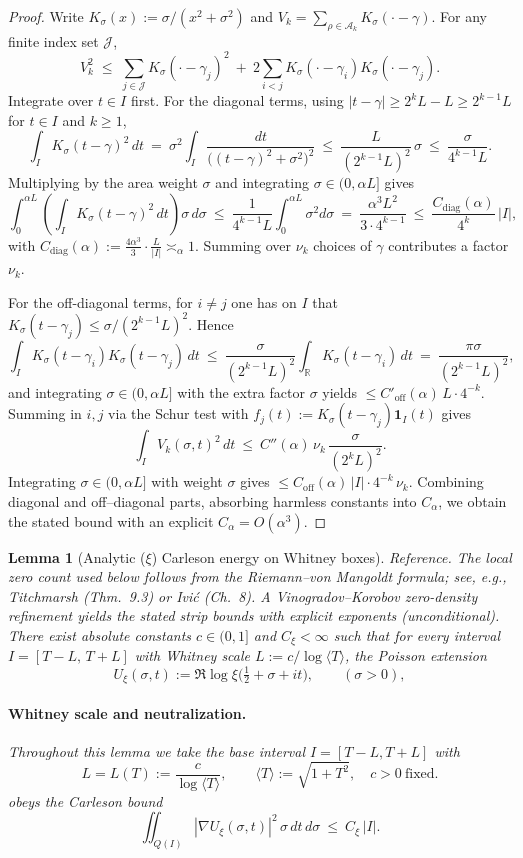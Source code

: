 \documentclass[11pt]{article}
\newtheorem{lemma}[theorem]{Lemma}
\theoremstyle{definition}
\theoremstyle{remark}
\newcommand{\R}{\mathbb{R}}
\begin{document}
\begin{proof}
Write $K_\sigma(x):=\sigma/(x^2+\sigma^2)$ and $V_k=\sum_{\rho\in\mathcal A_k}K_\sigma(\cdot-\gamma)$. For any finite index set $\mathcal J$,
\[
  V_k^2\;\le\; \sum_{j\in\mathcal J} K_\sigma(\cdot-\gamma_j)^2\ +\ 2\!\!\sum_{i<j} K_\sigma(\cdot-\gamma_i)K_\sigma(\cdot-\gamma_j).
\]
Integrate over $t\in I$ first. For the diagonal terms, using $|t-\gamma|\ge 2^kL-L\ge 2^{k-1}L$ for $t\in I$ and $k\ge 1$,
\[
 \int_I K_\sigma(t-\gamma)^2\,dt\ =\ \sigma^2\!\int_I \frac{dt}{\big((t-\gamma)^2+\sigma^2\big)^2}\ \le\ \frac{L}{(2^{k-1}L)^2}\,\sigma\ \le\ \frac{\sigma}{4^{k-1}L}.
\]
Multiplying by the area weight $\sigma$ and integrating $\sigma\in(0,\alpha L]$ gives
\[
 \int_0^{\alpha L}\!\!\left(\int_I K_\sigma(t-\gamma)^2\,dt\right)\sigma\,d\sigma\ \le\ \frac{1}{4^{k-1}L}\int_0^{\alpha L}\!\sigma^2 d\sigma\ =\ \frac{\alpha^3 L^2}{3\cdot 4^{k-1}}\ \le\ \frac{C_{\mathrm{diag}}(\alpha)}{4^{k}}\,|I|,
\]
with $C_{\mathrm{diag}}(\alpha):=\tfrac{4\alpha^3}{3}\cdot\tfrac{L}{|I|}\asymp_\alpha 1$. Summing over $\nu_k$ choices of $\gamma$ contributes a factor $\nu_k$.

For the off-diagonal terms, for $i\ne j$ one has on $I$ that $K_\sigma(t-\gamma_j)\le \sigma/(2^{k-1}L)^2$. Hence
\[
 \int_I K_\sigma(t-\gamma_i)K_\sigma(t-\gamma_j)\,dt\ \le\ \frac{\sigma}{(2^{k-1}L)^2}\int_\R K_\sigma(t-\gamma_i)\,dt\ =\ \frac{\pi\sigma}{(2^{k-1}L)^2},
\]
and integrating $\sigma\in(0,\alpha L]$ with the extra factor $\sigma$ yields $\le C'_{\mathrm{off}}(\alpha)\,L\cdot 4^{-k}$. Summing in $i,j$ via the Schur test with $f_j(t):=K_\sigma(t-\gamma_j)\mathbf 1_I(t)$ gives
\[
 \int_I V_k(\sigma,t)^2\,dt\ \le\ C''(\alpha)\,\nu_k\,\frac{\sigma}{(2^kL)^2}.
\]
Integrating $\sigma\in(0,\alpha L]$ with weight $\sigma$ gives $\le C_{\mathrm{off}}(\alpha)\,|I|\cdot 4^{-k}\,\nu_k$. Combining diagonal and off–diagonal parts, absorbing harmless constants into $C_\alpha$, we obtain the stated bound with an explicit $C_\alpha=O(\alpha^3)$.
\end{proof}

\begin{lemma}[Analytic ($\xi$) Carleson energy on Whitney boxes]\label{lem:carleson-xi}
\emph{Reference.} The local zero count used below follows from the Riemann–von Mangoldt formula; see, e.g., Titchmarsh (Thm.~9.3) or Ivi\'c (Ch.~8). A Vinogradov–Korobov zero-density refinement yields the stated strip bounds with explicit exponents (unconditional).
There exist absolute constants $c\in(0,1]$ and $C_\xi<\infty$ such that for every interval $I=[T-L,\,T+L]$ with Whitney scale $L:=c/\log\langle T\rangle$, the Poisson extension
\[
 U_{\xi}(\sigma,t):=\Re\log\xi\big(\tfrac12+\sigma+it\big),\qquad (\sigma>0),
\]
\paragraph{Whitney scale and neutralization.}
Throughout this lemma we take the base interval $I=[T-L,T+L]$ with
\[
  L=L(T):=\frac{c}{\log\langle T\rangle},\qquad \langle T\rangle:=\sqrt{1+T^2},\quad c>0\ \text{fixed}.
\]
obeys the Carleson bound
\[ \iint_{Q(I)} |\nabla U_{\xi}(\sigma,t)|^2\,\sigma\,dt\,d\sigma\ \le\ C_\xi\,|I|. \]
\end{lemma}
\end{document}
